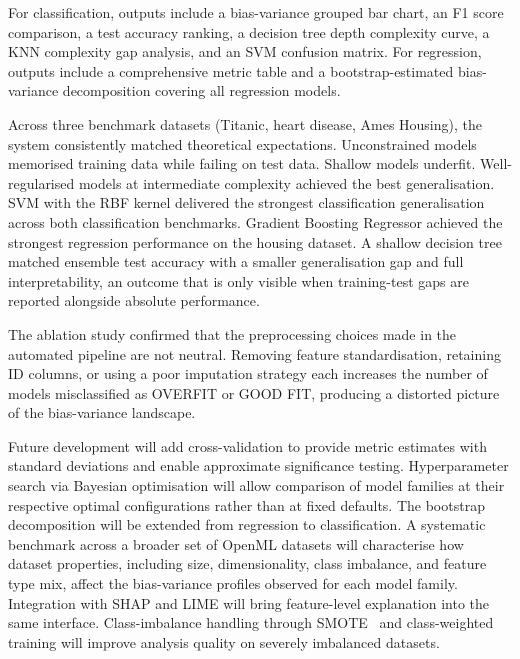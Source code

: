 \documentclass[conference]{IEEEtran}
\begin{document}
For classification, outputs include a bias-variance grouped bar chart, an F1 score comparison, a test accuracy ranking, a decision tree depth complexity curve, a KNN complexity gap analysis, and an SVM confusion matrix. For regression, outputs include a comprehensive metric table and a bootstrap-estimated bias-variance decomposition covering all regression models.

Across three benchmark datasets (Titanic, heart disease, Ames Housing), the system consistently matched theoretical expectations. Unconstrained models memorised training data while failing on test data. Shallow models underfit. Well-regularised models at intermediate complexity achieved the best generalisation. SVM with the RBF kernel delivered the strongest classification generalisation across both classification benchmarks. Gradient Boosting Regressor achieved the strongest regression performance on the housing dataset. A shallow decision tree matched ensemble test accuracy with a smaller generalisation gap and full interpretability, an outcome that is only visible when training-test gaps are reported alongside absolute performance.

The ablation study confirmed that the preprocessing choices made in the automated pipeline are not neutral. Removing feature standardisation, retaining ID columns, or using a poor imputation strategy each increases the number of models misclassified as OVERFIT or GOOD FIT, producing a distorted picture of the bias-variance landscape.

Future development will add cross-validation to provide metric estimates with standard deviations and enable approximate significance testing. Hyperparameter search via Bayesian optimisation will allow comparison of model families at their respective optimal configurations rather than at fixed defaults. The bootstrap decomposition will be extended from regression to classification. A systematic benchmark across a broader set of OpenML datasets will characterise how dataset properties, including size, dimensionality, class imbalance, and feature type mix, affect the bias-variance profiles observed for each model family. Integration with SHAP and LIME will bring feature-level explanation into the same interface. Class-imbalance handling through SMOTE~\cite{b35} and class-weighted training will improve analysis quality on severely imbalanced datasets.
\end{document}
